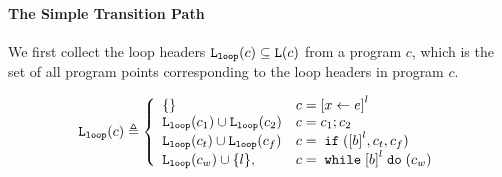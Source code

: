 \paragraph{The Simple Transition Path}
We first collect the loop headers $\mathtt{L}_{\mathtt{loop}}(c) \subseteq \mathtt{L}(c)$ from a program $c$, which is the set of all program points corresponding to the loop headers in program $c$.
\begin{defn}
  \label{def:loopl}
  \[
  \loopl(c) \triangleq 
  \left\{
    \begin{array}{ll}
      \{\}  & {c} = \clabel{\assign x e}^{l} \\
      \loopl({c_1}) \cup \loopl({{c_2}})  & {c} = {c_1};{c_2} \\
      \loopl(c_t) \cup \loopl({{c_f}})   & {c} =\eif(\clabel{\bexpr}^{l}, c_t, c_f) \\
  \loopl(c_w) \cup \{l\}, &  {c}   = \ewhile \clabel{\bexpr}^{l} \edo (c_w)
  \end{array}
\right.
\]
  \end{defn}

